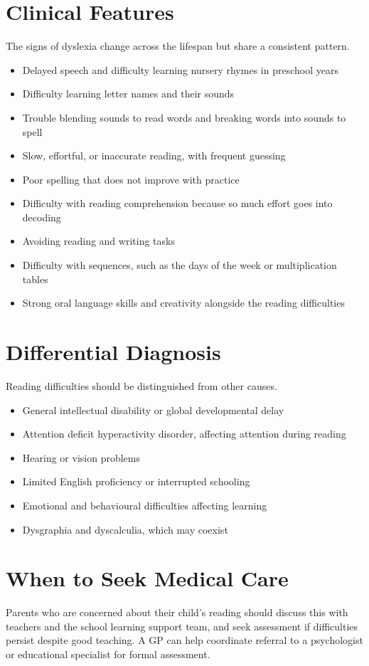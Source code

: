 \section*{Clinical Features}
The signs of dyslexia change across the lifespan but share a consistent pattern.
\begin{itemize}
    \item Delayed speech and difficulty learning nursery rhymes in preschool years
    \item Difficulty learning letter names and their sounds
    \item Trouble blending sounds to read words and breaking words into sounds to spell
    \item Slow, effortful, or inaccurate reading, with frequent guessing
    \item Poor spelling that does not improve with practice
    \item Difficulty with reading comprehension because so much effort goes into decoding
    \item Avoiding reading and writing tasks
    \item Difficulty with sequences, such as the days of the week or multiplication tables
    \item Strong oral language skills and creativity alongside the reading difficulties
\end{itemize}

\section*{Differential Diagnosis}
Reading difficulties should be distinguished from other causes.
\begin{itemize}
    \item General intellectual disability or global developmental delay
    \item Attention deficit hyperactivity disorder, affecting attention during reading
    \item Hearing or vision problems
    \item Limited English proficiency or interrupted schooling
    \item Emotional and behavioural difficulties affecting learning
    \item Dysgraphia and dyscalculia, which may coexist
\end{itemize}

\section*{When to Seek Medical Care}
Parents who are concerned about their child's reading should discuss this with teachers and the school learning support team, and seek assessment if difficulties persist despite good teaching. A GP can help coordinate referral to a psychologist or educational specialist for formal assessment.

